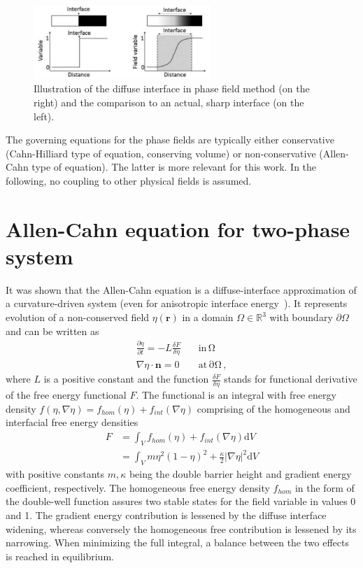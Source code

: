 \begin{figure}
	\centering
	\includegraphics[width = 0.6\textwidth]{chapters/03PFintro/image/diffuse_interface_Bellemans2017}
	\caption[Interface width in phase field method]{Illustration of the diffuse interface in phase field method (on the right) and the comparison to an actual, sharp interface (on the left).~\cite{Bellemans2017}}
	\label{fig_PFintro_diffuse_interface}
\end{figure}

The governing equations for the phase fields are typically either conservative (Cahn-Hilliard type of equation, conserving volume) or non-conservative (Allen-Cahn type of equation). The latter is more relevant for this work. In the following, no coupling to other physical fields is assumed.

\section{Allen-Cahn equation for two-phase system}
It was shown that the Allen-Cahn equation is a diffuse-interface approximation of a curvature-driven system (even for anisotropic interface energy~\cite{Elliott1996}). It represents evolution of a non-conserved field $\eta(\mathbf{r})$ in a domain $\Omega\in\mathbb{R}^3$ with boundary $\partial\Omega$ and can be written as
\begin{align}
	\frac{\partial \eta}{\partial t} = -L\frac{\delta F}{\delta \eta} \quad &\mathrm{in \,\Omega}\\
	\nabla\eta\cdot\bm{n} = 0 \quad &\mathrm{at \, \partial\Omega}\,,
\end{align}
where $L$ is a positive constant and the function $\frac{\delta F}{\delta \eta}$ stands for functional derivative of the free energy functional $F$. The functional is an integral with free energy density $f(\eta,\nabla\eta)=f_{hom}(\eta)+f_{int}(\nabla\eta)$ comprising of the homogeneous and interfacial free energy densities
\begin{align}
	F 	&= \int_V f_{hom}(\eta)+f_{int}(\nabla\eta) \mathrm{d}V\\
		&= \int_V m \eta^2(1-\eta)^2 + \frac{\kappa}{2}|\nabla\eta|^2 \mathrm{d}V
\end{align}
with positive constants $m,\kappa$ being the double barrier height and gradient energy coefficient, respectively. The homogeneous free energy density $f_{hom}$ in the form of the double-well function assures two stable states for the field variable in values 0 and 1. The gradient energy contribution is lessened by the diffuse interface widening, whereas conversely the homogeneous free contribution is lessened by its narrowing. When minimizing the full integral, a balance between the two effects is reached in equilibrium.

